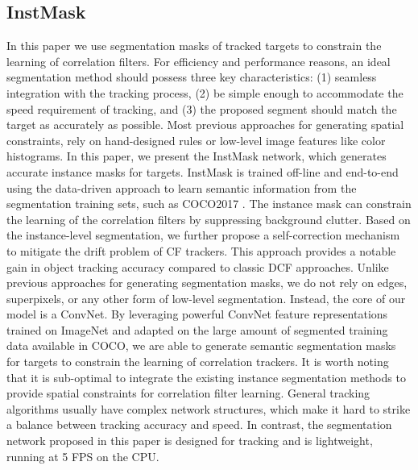 \subsection{InstMask}
\label{sec:InstMask}
In this paper we use segmentation masks of tracked targets to constrain the learning of correlation filters. For efficiency and performance reasons, an ideal segmentation method should possess three key characteristics: (1) seamless integration with the tracking process, (2) be simple enough to accommodate the speed requirement of tracking, and (3) the proposed segment should match the target as accurately as possible.
Most previous approaches for generating spatial constraints, rely on hand-designed rules or low-level image features like color histograms.
In this paper, we present the InstMask network, which generates accurate instance masks for targets. InstMask is trained off-line and end-to-end using the data-driven approach to learn semantic information from the segmentation training sets, such as COCO2017 \cite{COCO}. The instance mask can constrain the learning of the correlation filters by suppressing background clutter. Based on the instance-level segmentation, we further propose a self-correction mechanism to mitigate the drift problem of CF trackers. This approach provides a notable gain in object tracking accuracy compared to classic DCF approaches.
Unlike previous approaches for generating segmentation masks, we do not rely on edges, superpixels, or any other form of low-level segmentation. Instead, the core of our model is a ConvNet. By leveraging powerful ConvNet feature representations trained on ImageNet and adapted on the large amount of segmented training data available in COCO, we are able to generate semantic segmentation masks for targets to constrain the learning of correlation trackers.
It is worth noting that it is sub-optimal to integrate the existing instance segmentation methods to provide spatial constraints for correlation filter learning. General tracking algorithms usually have complex network structures, which make it hard to strike a balance between tracking accuracy and speed. In contrast, the segmentation network proposed in this paper is designed for tracking and is lightweight, running at 5 FPS on the CPU.

